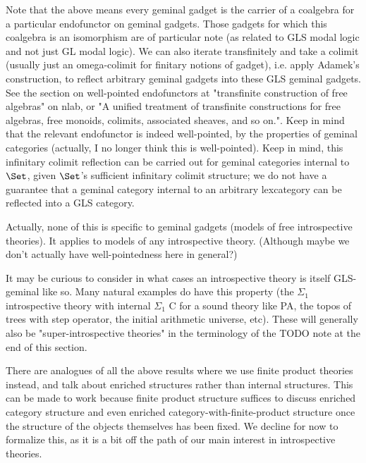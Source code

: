 \begin{TODOblock}
Note that the above means every geminal gadget is the carrier of a coalgebra for a particular endofunctor on geminal gadgets. Those gadgets for which this coalgebra is an isomorphism are of particular note (as related to GLS modal logic and not just GL modal logic). We can also iterate transfinitely and take a colimit (usually just an omega-colimit for finitary notions of gadget), i.e. apply Adamek's construction, to reflect arbitrary geminal gadgets into these GLS geminal gadgets. See the section on well-pointed endofunctors at "transfinite construction of free algebras" on nlab, or "A unified treatment of transfinite constructions for free algebras, free monoids, colimits, associated sheaves, and so on.". Keep in mind that the relevant endofunctor is indeed well-pointed, by the properties of geminal categories (actually, I no longer think this is well-pointed). Keep in mind, this infinitary colimit reflection can be carried out for geminal categories internal to $\Set$, given $\Set$'s sufficient infinitary colimit structure; we do not have a guarantee that a geminal category internal to an arbitrary lexcategory can be reflected into a GLS category.

Actually, none of this is specific to geminal gadgets (models of free introspective theories). It applies to models of any introspective theory. (Although maybe we don't actually have well-pointedness here in general?)

It may be curious to consider in what cases an introspective theory is itself GLS-geminal like so. Many natural examples do have this property (the $\Sigma_1$ introspective theory with internal $\Sigma_1$ C for a sound theory like PA, the topos of trees with step operator, the initial arithmetic universe, etc). These will generally also be "super-introspective theories" in the terminology of the TODO note at the end of this section.
\end{TODOblock}

There are analogues of all the above results where we use finite product theories instead, and talk about enriched structures rather than internal structures. This can be made to work because finite product structure suffices to discuss enriched category structure and even enriched category-with-finite-product structure once the structure of the objects themselves has been fixed. We decline for now to formalize this, as it is a bit off the path of our main interest in introspective theories. 

